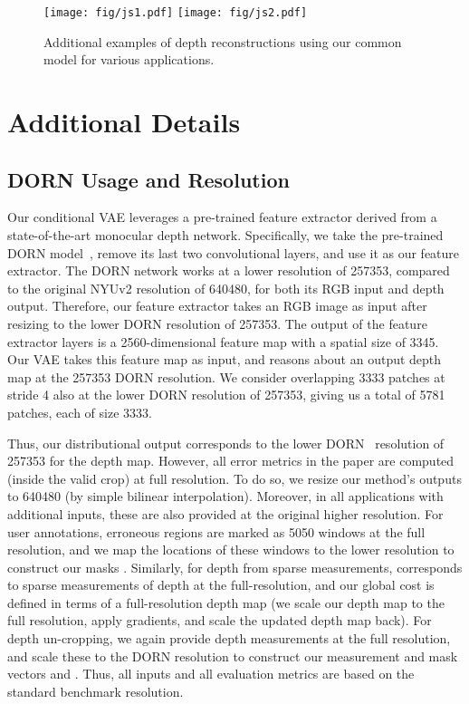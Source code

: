 \documentclass[10pt,twocolumn,letterpaper]{article}
\begin{document}
\begin{figure}[!h]
  \centering
  \texttt{[image: fig/js1.pdf]}
  \texttt{[image: fig/js2.pdf]} 
  \caption{Additional examples of depth reconstructions using our common model for various applications.}
  \label{fig:add}
\end{figure}

\section{Additional Details}

\subsection{DORN Usage and Resolution}

Our conditional VAE leverages a pre-trained feature extractor derived from a state-of-the-art monocular depth network. Specifically, we take the pre-trained DORN model~\cite{fu2018deep}, remove its last two convolutional layers, and use it as our feature extractor. The DORN network works at a lower resolution of 257353, compared to the original NYUv2 resolution of 640480, for both its RGB input and depth output. Therefore, our feature extractor takes an  RGB image as input after resizing to the lower DORN resolution of 257353. The output of the feature extractor layers is a 2560-dimensional feature map with a spatial size of 3345. Our VAE takes this feature map as input, and reasons about an output depth map at the 257353 DORN resolution. We consider overlapping 3333 patches at stride 4 also at the lower DORN resolution of 257353, giving us a total of 5781 patches, each of size 3333.

Thus, our distributional output corresponds to the lower DORN~\cite{fu2018deep} resolution of 257353 for the depth map. However, all error metrics in the paper are computed (inside the valid crop) at full resolution. To do so, we resize our method's outputs to 640480 (by simple bilinear interpolation). Moreover, in all applications with additional inputs, these are also provided at the original higher resolution. For user annotations, erroneous regions are marked as 5050 windows at the full resolution, and we map the locations of these windows to the lower resolution to construct our masks . Similarly, for depth from sparse measurements,  corresponds to sparse measurements of depth at the full-resolution, and our global cost  is defined in terms of a full-resolution depth map (we scale our depth map to the full resolution, apply gradients, and scale the updated depth map back). For depth un-cropping, we again provide depth measurements at the full resolution, and scale these to the DORN resolution to construct our measurement and mask vectors  and . Thus, all inputs and all evaluation metrics are based on the standard benchmark resolution.
\end{document}
